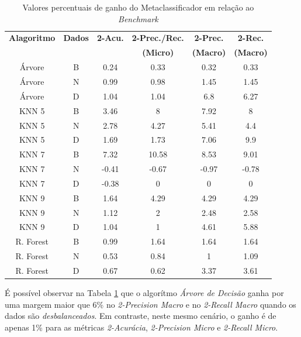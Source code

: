 \begin{table}[h!]
  \begin{center}
   \resizebox{\textwidth}{!} {
   \begin{tabular}{cccccc}
      \hline
      \textbf{Alagoritmo} & \textbf{Dados} &  \textbf{2-Acu.} & \textbf{2-Prec./Rec.} & \textbf{2-Prec.} & \textbf{2-Rec.} \\
          &     &     & \textbf{(Micro)} & \textbf{(Macro)} & \textbf{(Macro)} \\
      \hline


Árvore	&	B	&	0.24	&	0.33	&	0.32	&	0.33	\\
Árvore	&	N	&	0.99	&	0.98	&	1.45	&	1.45	\\
Árvore	&	D	&	1.04	&	1.04	&	6.8	&	6.27	\\
KNN 5	&	B	&	3.46	&	8	&	7.92	&	8	\\
KNN 5	&	N	&	2.78	&	4.27	&	5.41	&	4.4	\\
KNN 5	&	D	&	1.69	&	1.73	&	7.06	&	9.9	\\
KNN 7	&	B	&	7.32	&	10.58	&	8.53	&	9.01	\\
KNN 7	&	N	&	-0.41	&	-0.67	&	-0.97	&	-0.78	\\
KNN 7	&	D	&	-0.38	&	0	&	0	&	0	\\
KNN 9	&	B	&	1.64	&	4.29	&	4.29	&	4.29	\\
KNN 9	&	N	&	1.12	&	2	&	2.48	&	2.58	\\
KNN 9	&	D	&	1.04	&	1	&	4.61	&	5.88	\\
R. Forest	&	B	&	0.99	&	1.64	&	1.64	&	1.64	\\
R. Forest	&	N	&	0.53	&	0.84	&	1	&	1.09	\\
R. Forest	&	D	&	0.67	&	0.62	&	3.37	&	3.61	\\

      \hline
    \end{tabular}
    }
    \caption{Valores percentuais de ganho do Metaclassificador em relação ao \textit{Benchmark}}
    \label{tab:ganho_meta}
  \end{center}
\end{table}

É possível observar na Tabela \ref{tab:ganho_meta} que o algorítmo \textit{Árvore de Decisão } ganha por uma margem maior que 6\% no \textit{2-Precision Macro} e no \textit{2-Recall Macro} quando os dados são \textit{desbalanceados}.
Em contraste, neste mesmo cenário, o ganho é de apenas 1\% para as métricas \textit{2-Acurácia}, \textit{2-Precision Micro} e \textit{2-Recall Micro}.


